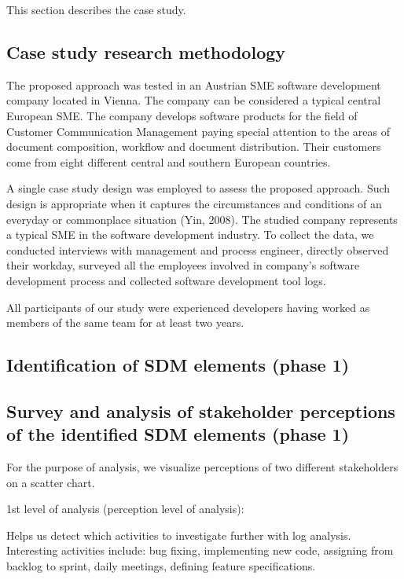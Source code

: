 This section describes the case study. 

\subsection{Case study research methodology}

The proposed approach was tested in an Austrian SME software development company located in Vienna. The company can be considered a typical central European SME. The company develops software products for the field of Customer Communication Management paying special attention to the areas of document composition, workflow and document distribution. Their customers come from eight different central and southern European countries. 

A single case study design was employed to assess the proposed approach. Such design is appropriate when it captures the circumstances and conditions of an everyday or commonplace situation (Yin, 2008). The studied company represents a typical SME in the software development industry. To collect the data, we conducted interviews with management and process engineer, directly observed their workday, surveyed all the employees involved in company’s software development process and collected software development tool logs. 

All participants of our study were experienced developers having worked as members of the same team for at least two years. 

\subsection{Identification of SDM elements (phase 1)}

\subsection{Survey and analysis of stakeholder perceptions of the identified SDM elements (phase 1)}


For the purpose of analysis, we visualize perceptions of two different stakeholders on a scatter chart. 




1st level of analysis (perception level of analysis): 



Helps us detect which activities to investigate further with log analysis. Interesting activities include: bug fixing, implementing new code, assigning from backlog to sprint, daily meetings, defining feature specifications. 

